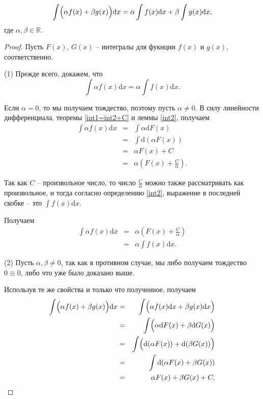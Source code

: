 \begin{proposition}\label{linearity_of_int}
      \[
     \int \Bigl(\alpha f(x) + \beta g(x) \Bigr) \mathrm{d}x = \alpha \int f(x) \mathrm{d}x +\beta \int g(x) \mathrm{d}x,
    \]
    где $\alpha, \beta \in \mathbb{R}.$
\end{proposition}
\begin{proof}
  Пусть $F(x)$, $G(x)$ -- интегралы для фукнции $f(x)$ и $g(x)$, соответственно.
  
(1) Прежде всего, докажем, что 
  \[
   \int \alpha f(x) \mathrm{d}x = \alpha \int f(x) \mathrm{d}x.
  \]

 Если $\alpha = 0$, то мы получаем тождество, поэтому пусть $\alpha \ne 0.$ В силу линейности дифференциала, теоремы \ref{int1=int2+C} и леммы \ref{int2}, получаем
 \begin{eqnarray*}
     \int \alpha f(x) \mathrm{d}x &=& \int \alpha \mathrm{d}F(x) \\
     &=& \int \mathrm{d}(\alpha F(x)) \\
     &=& \alpha F(x) + C \\
     &=& \alpha \left( F(x) + \frac{C}{\alpha} \right).
 \end{eqnarray*}

 Так как $C$ -- произвольное число, то число $\frac{C}{\alpha}$ можно также рассматривать как произвольное, и тогда согласно определению \ref{int2}, выражение в последней скобке -- это $\int f(x) \mathrm{d}x$.

 Получаем
\begin{eqnarray*}
     \int \alpha f(x) \mathrm{d}x &=&\alpha \left( F(x) + \frac{C}{\alpha} \right) \\
     & =& \alpha \int f(x) \mathrm{d}x.
\end{eqnarray*}

(2) Пусть $\alpha, \beta\ne 0$, так как в противном случае, мы либо получаем тождество $0 \equiv 0$, либо что уже было доказано выше.

Используя те же свойства и только что полученное, получаем
\begin{eqnarray*}
    \int \Bigl(\alpha f(x) + \beta g(x) \Bigr) \mathrm{d}x &=& \int\Bigl( \alpha f(x) \mathrm{d}x + \beta g(x) \mathrm{d}x \Bigr) \\
    &=& \int \Bigl( \alpha \mathrm{d}F(x) + \beta \mathrm{d}G(x) \Bigr) \\
    &=& \int \Bigl( \mathrm{d}(\alpha F(x)) + \mathrm{d}(\beta G(x))  \Bigr) \\
    &=& \int \mathrm{d}(\alpha F(x) + \beta G(x)) \\
    &=& \alpha F(x) + \beta G(x) + C.
\end{eqnarray*}


\end{proof}
